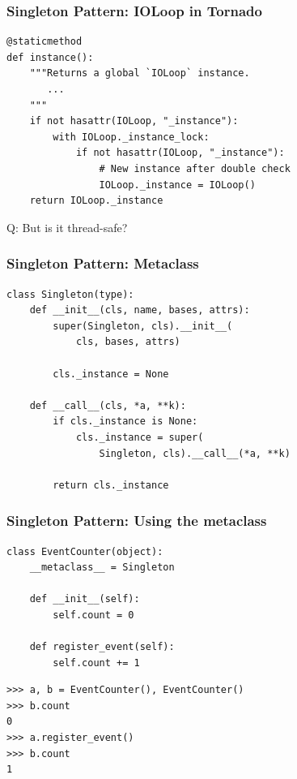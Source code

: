 \documentclass{beamer}
\begin{document}
\begin{frame}[fragile]
\frametitle{Singleton Pattern: IOLoop in Tornado}
\begin{footnotesize}
\begin{verbatim}
@staticmethod
def instance():
    """Returns a global `IOLoop` instance.
       ...
    """
    if not hasattr(IOLoop, "_instance"):
        with IOLoop._instance_lock:
            if not hasattr(IOLoop, "_instance"):
                # New instance after double check
                IOLoop._instance = IOLoop()
    return IOLoop._instance
\end{verbatim}
\end{footnotesize}
\linebreak
Q: But is it thread-safe?
\end{frame}

\begin{frame}[fragile]
\frametitle{Singleton Pattern: Metaclass}
\begin{verbatim}
class Singleton(type):
    def __init__(cls, name, bases, attrs):
        super(Singleton, cls).__init__(
            cls, bases, attrs)
        
        cls._instance = None

    def __call__(cls, *a, **k):
        if cls._instance is None:
            cls._instance = super(
                Singleton, cls).__call__(*a, **k)

        return cls._instance
\end{verbatim}
\end{frame}

\begin{frame}[fragile]
\frametitle{Singleton Pattern: Using the metaclass}
\begin{verbatim}
class EventCounter(object):
    __metaclass__ = Singleton

    def __init__(self):
        self.count = 0

    def register_event(self):
        self.count += 1
\end{verbatim}

\begin{small}
\begin{verbatim}
>>> a, b = EventCounter(), EventCounter()
>>> b.count
0
>>> a.register_event()
>>> b.count
1
\end{verbatim}
\end{small}
\end{frame}
\end{document}
